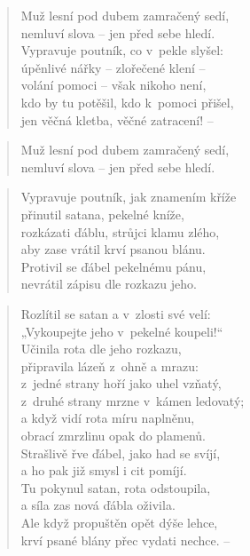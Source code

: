 \begin{verse}
Muž lesní pod dubem zamračený sedí, \\
nemluví slova -- jen před sebe hledí. \\
Vypravuje poutník, co v~pekle slyšel: \\
úpěnlivé nářky -- zlořečené klení -- \\
volání pomoci -- však nikoho není, \\
kdo by tu potěšil, kdo k~pomoci přišel, \\
jen věčná kletba, věčné zatracení! --
\end{verse}

\begin{verse}
Muž lesní pod dubem zamračený sedí, \\
nemluví slova -- jen před sebe hledí.
\end{verse}

\begin{verse}
Vypravuje poutník, jak znamením kříže \\
přinutil satana, pekelné kníže, \\
rozkázati ďáblu, strůjci klamu zlého, \\
aby zase vrátil krví psanou blánu. \\
Protivil se ďábel pekelnému pánu, \\
nevrátil zápisu dle rozkazu jeho.
\end{verse}

\begin{verse}
Rozlítil se satan a v~zlosti své velí: \\
„Vykoupejte jeho v~pekelné koupeli!“ \\
Učinila rota dle jeho rozkazu, \\
připravila lázeň z~ohně a mrazu: \\
z~jedné strany hoří jako uhel vzňatý, \\
z~druhé strany mrzne v~kámen ledovatý; \\
a když vidí rota míru naplněnu, \\
obrací zmrzlinu opak do plamenů. \\
Strašlivě řve ďábel, jako had se svíjí, \\
a ho pak již smysl i cit pomíjí. \\
Tu pokynul satan, rota odstoupila, \\
a síla zas nová ďábla oživila. \\
Ale když propuštěn opět dýše lehce, \\
krví psané blány přec vydati nechce. --
\end{verse}

